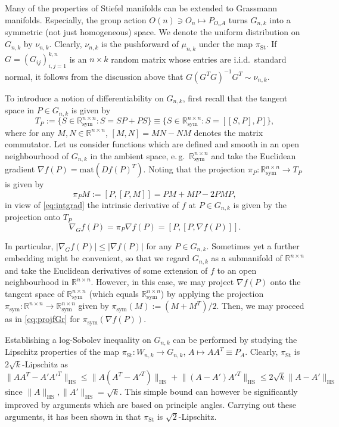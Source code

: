 \documentclass[a4paper,12pt]{amsart}
\numberwithin{equation}{section}
\theoremstyle{remark}
\def\pist{\pi_\mathrm{St}}
\def\pis{\pi_\mathrm{sym}}
\def\Rns{\mathbb{R}^{n \times n}_\mathrm{sym}}
\begin{document}
Many of the properties of Stiefel manifolds can be extended to Grassmann manifolds. Especially, the group action $O(n) \ni O_n \mapsto P_{O_nA}$ turns $G_{n,k}$ into a symmetric (not just homogeneous) space. We denote the uniform distribution on $G_{n,k}$ by $\nu_{n,k}$. Clearly, $\nu_{n,k}$ is the pushforward of $\mu_{n,k}$ under the map $\pist$. If $G = (G_{ij})_{i,j=1}^{k,n}$ is an $n \times k$ random matrix whose entries are i.i.d.\ standard normal, it follows from the discussion above that $G(G^TG)^{-1}G^T \sim \nu_{n,k}$.

To introduce a notion of differentiability on $G_{n,k}$, first recall that the tangent space in $P \in G_{n,k}$ is given by
\[
T_P := \{S \in \Rns \colon S = SP + PS\} \equiv \{S \in \Rns \colon S = [[S,P],P]\},
\]
where for any $M,N \in \mathbb{R}^{n \times n}$, $[M,N] = MN - NM$ denotes the matrix commutator. Let us consider functions which are defined and smooth in an open neighbourhood of $G_{n,k}$ in the ambient space, e.\,g.\ $\Rns$ and take the Euclidean gradient $\nabla f(P) = \mathrm{mat}(Df(P)^T)$. Noting that the projection $\pi_P \colon \Rns \to T_P$ is given by
\begin{equation}\label{eq:projfGr}
	\pi_P M := [P,[P,M]] = PM + MP - 2PMP,
\end{equation}
in view of \eqref{eq:intgrad} the intrinsic derivative of $f$ at $P \in G_{n,k}$ is given by the projection onto $T_P$
\begin{equation}\label{eq:FormelGradientGrassmann}
\nabla_G f(P) = \pi_P\nabla f(P) = [P,[P,\nabla f(P)]].
\end{equation}

In particular, $|\nabla_G f(P)| \leq |\nabla f(P)|$ for any $P \in G_{n,k}$. Sometimes yet a further embedding might be convenient, so that we regard $G_{n,k}$ as a submanifold of $\mathbb{R}^{n \times n}$ and take the Euclidean derivatives of some extension of $f$ to an open neighbourhood in $\mathbb{R}^{n \times n}$. However, in this case, we may project $\nabla f(P)$ onto the tangent space of $\Rns$ (which equals $\Rns$) by applying the projection $\pis \colon \mathbb{R}^{n \times n} \to \Rns$ given by $\pis(M) := (M + M^T)/2$. Then, we may proceed as in \eqref{eq:projfGr} for $\pis(\nabla f(P))$.

Establishing a log-Sobolev inequality on $G_{n,k}$ can be performed by studying the Lipschitz properties of the map $\pist \colon W_{n,k} \to G_{n,k}$, $A \mapsto AA^T \equiv P_A$. Clearly, $\pist$ is $2\sqrt{k}$-Lipschitz as
\[
\lVert AA^T - A'A'^T \rVert_\mathrm{HS} \le \lVert A(A^T - A'^T) \rVert_\mathrm{HS} + \lVert (A-A')A'^T \rVert_\mathrm{HS} \le 2\sqrt{k} \lVert A-A' \rVert_\mathrm{HS}
\]
since $\lVert A \rVert_\mathrm{HS}, \lVert A' \rVert_\mathrm{HS} = \sqrt{k}$. This simple bound can however be significantly improved by arguments which are based on principle angles. Carrying out these arguments, it has been shown in \cite[Le.\ 6.1]{GS23} that $\pist$ is $\sqrt{2}$-Lipschitz.
\end{document}
